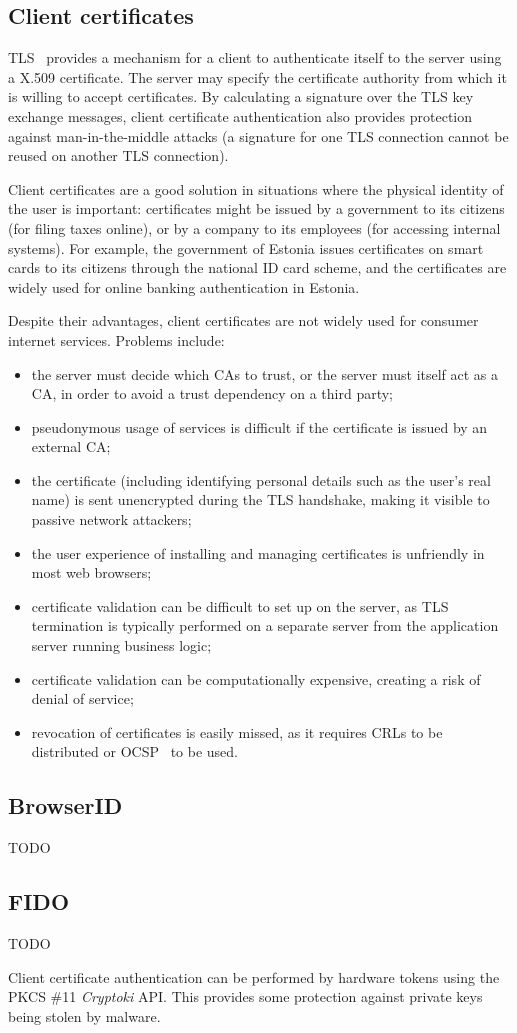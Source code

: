\subsection{Client certificates}

TLS~\cite{TLS} provides a mechanism for a client to authenticate itself to the server using a X.509
certificate. The server may specify the certificate authority from which it is willing to accept
certificates. By calculating a signature over the TLS key exchange messages, client certificate
authentication also provides protection against man-in-the-middle attacks (a signature for one TLS
connection cannot be reused on another TLS connection).

Client certificates are a good solution in situations where the physical identity of the user is
important: certificates might be issued by a government to its citizens (for filing taxes online),
or by a company to its employees (for accessing internal systems). For example, the government of
Estonia issues certificates on smart cards to its citizens through the national ID card scheme, and
the certificates are widely used for online banking authentication in Estonia.~\cite{Parsovs14}

Despite their advantages, client certificates are not widely used for consumer internet services.
Problems include:

\begin{itemize}
\item the server must decide which CAs to trust, or the server must itself act as a CA, in order to
avoid a trust dependency on a third party;
\item pseudonymous usage of services is difficult if the certificate is issued by an external CA;
\item the certificate (including identifying personal details such as the user's real name) is sent
unencrypted during the TLS handshake, making it visible to passive network attackers;
\item the user experience of installing and managing certificates is unfriendly in most web
browsers;
\item certificate validation can be difficult to set up on the server, as TLS termination is
typically performed on a separate server from the application server running business logic;
\item certificate validation can be computationally expensive, creating a risk of denial of
service;~\cite{Parsovs14}
\item revocation of certificates is easily missed, as it requires CRLs to be distributed or
OCSP~\cite{OCSP} to be used.
\end{itemize}

\subsection{BrowserID}
TODO
\subsection{FIDO}
TODO

Client certificate authentication can be performed by hardware tokens using the PKCS \#11
\emph{Cryptoki} API. This provides some protection against private keys being stolen by malware.
